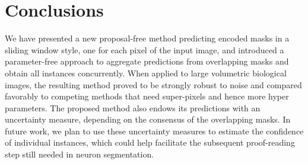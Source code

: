
\section{Conclusions}
We have presented a new proposal-free method predicting encoded \maskname masks in a sliding window style, one for each pixel of the input image, and introduced a parameter-free approach to aggregate predictions from overlapping masks and obtain all instances concurrently.
When applied to large volumetric biological images, the resulting method proved to be strongly robust to noise and compared favorably to competing methods that need super-pixels and hence more hyper parameters.
The proposed method also endows its predictions with an uncertainty measure, depending on the consensus of the overlapping \maskname masks. In future work, we plan to use these uncertainty measures to estimate the confidence of individual instances, which could help facilitate the subsequent proof-reading step still needed in neuron segmentation.
